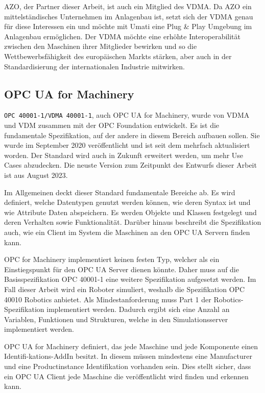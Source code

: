 \documentclass[a4paper, 12pt, oneside, toc=listofnumbered, bibliography=totoc]{scrbook}
\begin{document}
		AZO, der Partner dieser Arbeit, ist auch ein Mitglied des VDMA. Da AZO ein mittelständisches Unternehmen im Anlagenbau ist, setzt sich der VDMA genau für diese Interessen ein und möchte mit \ac{Umati} eine Plug \& Play Umgebung im Anlagenbau ermöglichen. Der VDMA möchte eine erhöhte Interoperabilität zwischen den Maschinen ihrer Mitglieder bewirken und so die Wettbewerbsfähigkeit des europäischen Markts stärken, aber auch in der Standardisierung der internationalen Industrie mitwirken. 
		
		\subsection{OPC UA for Machinery}
		
		\texttt{OPC 40001-1/VDMA 40001-1}, auch OPC UA for Machinery, wurde von VDMA und VDM zusammen mit der OPC Foundation entwickelt. Es ist die fundamentale Spezifikation, auf der andere in diesem Bereich aufbauen sollen. Sie wurde im September 2020 veröffentlicht und ist seit dem mehrfach aktualisiert worden. Der Standard wird auch in Zukunft erweitert werden, um mehr Use Cases abzudecken. Die neuste Version zum Zeitpunkt des Entwurfs dieser Arbeit ist aus August 2023.
		
		Im Allgemeinen deckt dieser Standard fundamentale Bereiche ab. Es wird definiert, welche Datentypen genutzt werden können, wie deren Syntax ist und wie Attribute Daten abspeichern. Es werden Objekte und Klassen festgelegt und deren Verhalten sowie Funktionalität. Darüber hinaus beschreibt die Spezifikation auch, wie ein Client im System die Maschinen an den OPC UA Servern finden kann. 
		
		OPC for Machinery implementiert keinen festen Typ, welcher als ein Einstiegspunkt für den OPC UA Server dienen könnte. Daher muss auf die Basisspezifikation OPC 40001-1 eine weitere Spezifikation aufgesetzt werden. Im Fall dieser Arbeit wird ein Roboter simuliert, weshalb die Spezifikation OPC 40010 Robotics anbietet. Als Mindestanforderung muss Part 1 der Robotics-Spezifikation implementiert werden. Dadurch ergibt sich eine Anzahl an Variablen, Funktionen und Strukturen, welche in den Simulationsserver implementiert werden.
		
		OPC UA for Machinery definiert, das jede Maschine und jede Komponente einen Identifi-kations-AddIn besitzt. In diesem müssen mindestens eine Manufacturer und eine Productinstance Identifikation vorhanden sein. Dies stellt sicher, dass ein OPC UA Client jede Maschine die veröffentlicht wird finden und erkennen kann.  
\end{document}
